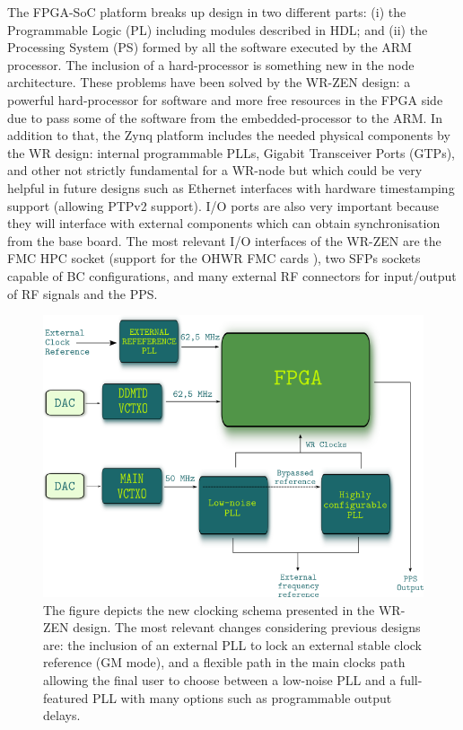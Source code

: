 The FPGA-SoC platform breaks up design in two different parts: (i) the 
Programmable Logic (PL) including modules described in HDL; and (ii) the 
Processing System (PS) formed by all the software executed by the ARM processor.
The inclusion of a hard-processor is something new in the node architecture.
These problems have been solved by the WR-ZEN design: a 
powerful hard-processor for software and more free resources in the FPGA side 
due to pass some of the software from the embedded-processor to the ARM. In 
addition to that, the Zynq platform includes the needed physical components by 
the WR design: internal programmable PLLs, Gigabit Transceiver Ports (GTPs), 
and other not strictly fundamental for a WR-node but which could be very 
helpful in future designs such as Ethernet interfaces with hardware timestamping 
support (allowing PTPv2 support). I/O ports are also very important because 
they will interface with external components which can obtain synchronisation 
from the base board. The most relevant I/O interfaces of the WR-ZEN are the FMC 
HPC socket (support for the OHWR \cite{ohwr:repo} FMC cards 
\cite{ohwr:fmc-fine-delay}), two SFPs sockets capable of BC configurations, and 
many external RF connectors for input/output of RF signals and the PPS.

\begin{figure}
	\centering
	\includegraphics[width=0.7\linewidth]{img/zenclkschema}
	\caption[WR-ZEN clocking schema]{The figure depicts the new clocking schema 
		presented in the WR-ZEN design. The most relevant changes considering 
		previous designs are: the inclusion of an external PLL to lock an 
		external 
		stable clock reference (GM mode), and a flexible path in the 
		main 
		clocks path allowing the final user to choose between a low-noise PLL 
		and a 
		full-featured PLL with many options such as programmable output delays.}
	\label{fig:zenclkschema}
\end{figure}

